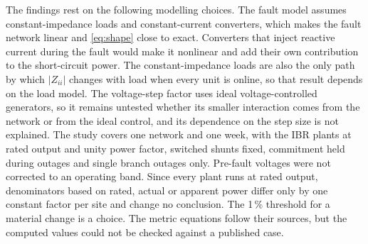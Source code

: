 The findings rest on the following modelling choices. The fault model assumes constant-impedance loads and
constant-current converters, which makes the fault network linear and \eqref{eq:shape} close to
exact. Converters that inject reactive current during the fault would make it nonlinear and add
their own contribution to the short-circuit power. The constant-impedance loads are also the only
path by which $|Z_{ii}|$ changes with load when every unit is online, so that result depends on
the load model. The voltage-step factor uses ideal voltage-controlled generators, so it remains
untested whether its smaller interaction comes from the network or from the ideal control, and
its dependence on the step size is not explained. The study covers one network and one week,
with the IBR plants at rated output and unity power factor, switched shunts fixed, commitment
held during outages and single branch outages only. Pre-fault voltages were not corrected to an
operating band. Since every plant runs at rated output, denominators based on rated, actual or
apparent power differ only by one constant factor per site and change no conclusion. The 1\,\%
threshold for a material change is a choice. The metric equations follow their sources, but the
computed values could not be checked against a published case.
